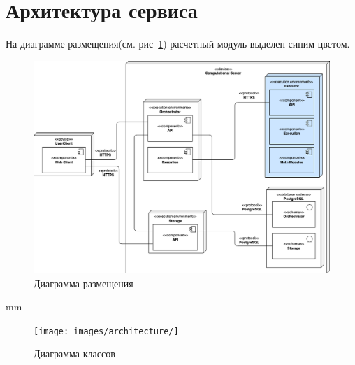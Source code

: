 \section*{\large{Архитектура сервиса}}

На диаграмме размещения(см. рис\ \ref{pic:architecture__deployment-diagram}) расчетный модуль выделен синим цветом.
\begin{figure}[H]
	\hspace*{-1 cm}\includegraphics[width=\textwidth]{images/architecture/deployment_diagram}
	\caption{Диаграмма размещения}
	\label{pic:architecture__deployment-diagram}
\end{figure}
 mm


\begin{figure}[H]
	\hspace*{-2.5 cm}\texttt{[image: images/architecture/]}
	\caption{Диаграмма классов}
	\label{pic:architecture__classes-diagram}
\end{figure}



